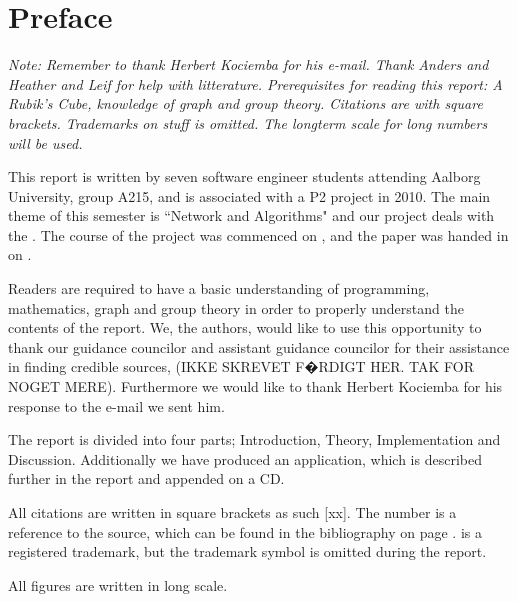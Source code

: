 \chapter*{Preface}
\textit{Note: Remember to thank Herbert Kociemba for his e-mail. Thank Anders and Heather and Leif for help with litterature. Prerequisites for reading this report: A Rubik's Cube, knowledge of graph and group theory. Citations are with square brackets. Trademarks on stuff is omitted. The longterm scale for long numbers will be used.}

This report is written by seven software engineer students attending Aalborg University, group A215, and is associated with a P2 project in 2010.
The main theme of this semester is ``Network and Algorithms" and our project deals with the \rubik{}.
The course of the project was commenced on , and the paper was handed in on .

Readers are required to have a basic understanding of programming, mathematics, graph and group theory in order to properly understand the contents of the report. 
We, the authors, would like to use this opportunity to thank our guidance councilor and assistant guidance councilor for their assistance in finding credible sources, (IKKE SKREVET F�RDIGT HER. TAK FOR NOGET MERE).
Furthermore we would like to thank Herbert Kociemba for his response to the e-mail we sent him.

The report is divided into four parts; Introduction, Theory, Implementation and Discussion. 
Additionally we have produced an application, which is described further in the report and appended on a CD.

All citations are written in square brackets as such [xx]. The number is a reference to the source, which can be found in the bibliography on page \pageref{chap:bib}. 
\rubik{} is a registered trademark, but the trademark symbol is omitted during the report.

All figures are written in long scale.
